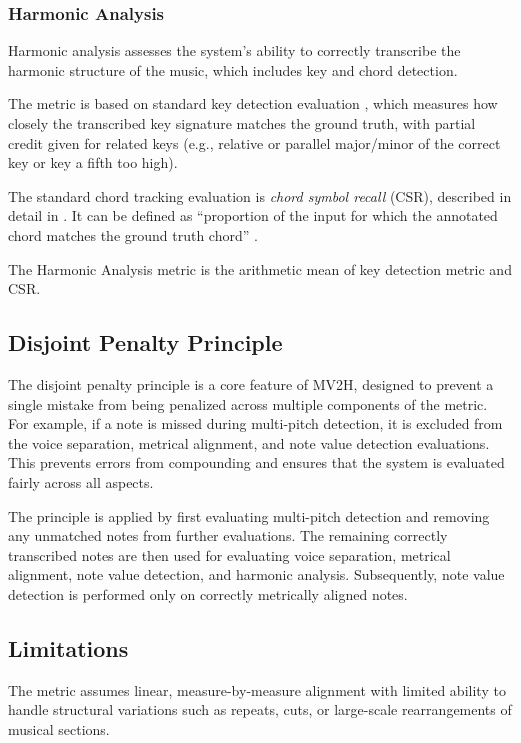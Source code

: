 \subsubsection{Harmonic Analysis}

Harmonic analysis assesses the system’s ability to correctly transcribe the harmonic structure of the music, which includes key and chord detection. 

The metric is based on standard key detection evaluation \cite{Raffel2014}, which measures how closely the transcribed key signature matches the ground truth, with partial credit given for related keys (e.g., relative or parallel major/minor of the correct key or key a fifth too high).

The standard chord tracking evaluation is \emph{chord symbol recall} (CSR), described in detail in \cite{Harte2010}. It can be defined as ``proportion of the input for which the annotated chord matches the ground truth chord'' \cite{McLeod2018}.

The Harmonic Analysis metric is the arithmetic mean of key detection metric and CSR.

\subsection{Disjoint Penalty Principle}

The disjoint penalty principle is a core feature of MV2H, designed to prevent a single mistake from being penalized across multiple components of the metric. For example, if a note is missed during multi-pitch detection, it is excluded from the voice separation, metrical alignment, and note value detection evaluations. This prevents errors from compounding and ensures that the system is evaluated fairly across all aspects.

The principle is applied by first evaluating multi-pitch detection and removing any unmatched notes from further evaluations. The remaining correctly transcribed notes are then used for evaluating voice separation, metrical alignment, note value detection, and harmonic analysis. Subsequently, note value detection is performed only on correctly metrically aligned notes.

\subsection{Limitations}

The metric assumes linear, measure-by-measure alignment with limited ability to handle structural variations such as repeats, cuts, or large-scale rearrangements of musical sections. 


